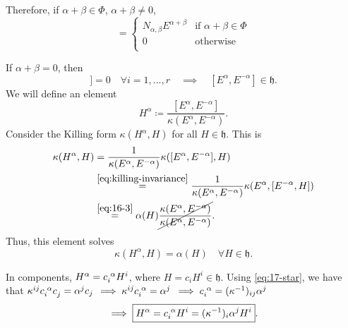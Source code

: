 Therefore, if $\alpha + \beta \in \Phi$, $\alpha + \beta \neq 0$,
 \begin{equation}
   [E^{\alpha}, E^{\beta}] =
   \begin{cases}
     N_{\alpha, \beta} E^{\alpha + \beta} & \text{if } \alpha + \beta \in \Phi \\
     0 & \text{otherwise} \\
   \end{cases}
\end{equation}

If $\alpha + \beta = 0$, then
 \begin{equation}
   [H^{i}, [E^{\alpha} , E^{-a}]]  =0 \quad \forall i = 1, \dots, r \quad\implies\quad [E^{\alpha} , E^{-\alpha}] \in \mathfrak{h}.
\end{equation}
We will define an element
\begin{equation}
  H^{\alpha} \coloneqq \frac{[E^{\alpha} , E^{-\alpha}]}{\kappa ( E^{\alpha} , E^{-\alpha})}.
\end{equation}
Consider the Killing form $\kappa(H^{\alpha} , H)$ for all $H \in \mathfrak{h}$. This is
\begin{align}
  \kappa(H^{\alpha} , H) &= \frac{1}{\kappa(E^{\alpha} , E^{-\alpha})} \kappa([E^{\alpha} , E^{-\alpha} ], H) \\
			 &\stackrel{\eqref{eq:killing-invariance}}{=} \frac{1}{\kappa(E^{\alpha}, E^{-\alpha})} \kappa (E^{\alpha}, [E^{-\alpha}, H]) \\
			 &\stackrel{\eqref{eq:16-3}}{=} \alpha(H) \cancel{\frac{\kappa(E^{\alpha}, E^{-\alpha})}{\kappa(E^{\alpha}, E^{-\alpha})}}.
\end{align}
Thus, this element solves
\begin{equation}
  \label{eq:17-star}
  \kappa(H^{\alpha}, H) = \alpha(H) \quad \forall H \in \mathfrak{h}.
\end{equation}

In components, $H^{\alpha} = c\indices{_{i}^{\alpha}} H^{i}$, where $H = c_{i} H^{i} \in \mathfrak{h}$.
Using \eqref{eq:17-star}, we have that $\kappa^{ij} c\indices{_{i}^{\alpha}} c\indices{_{j}} = \alpha^{j} c_{j}$ $\implies \kappa^{ij} c\indices{_{i}^{\alpha}}  = \alpha^{j}$ $\implies c\indices{_{i}^{\alpha}} = (\kappa^{-1})_{ij} \alpha^{j}$
\begin{equation}
  \label{eq:17-7}
  \implies \boxed{H^{\alpha} = c\indices{_{i}^{\alpha}} H^{i} = (\kappa^{-1})_{i} \alpha^{j} H^{i}}.
\end{equation}

